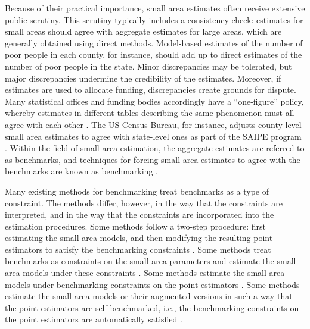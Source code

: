 \documentclass[12pt]{article}
\begin{document}
Because of their practical importance, small area estimates often receive extensive public scrutiny.   This scrutiny typically includes a consistency check: estimates for small areas should agree with aggregate estimates for large areas, which are generally obtained using direct methods.  Model-based estimates of the number of poor people in each county, for instance, should add up to direct estimates of the number of poor people in the state.  Minor discrepancies may be tolerated, but major discrepancies undermine the credibility of the estimates.  Moreover, if estimates are used to allocate funding, discrepancies create grounds for dispute.  Many statistical offices and funding bodies accordingly have a ``one-figure'' policy, whereby estimates in different tables describing the same phenomenon must all agree with each other \citep[][p. 232]{dewaal2016obtaining}.  The US Census Bureau, for instance, adjusts county-level small area estimates to agree with state-level ones as part of the SAIPE program \citep{census2013saipe}.  Within the field of small area estimation, the aggregate estimates are referred to as benchmarks, and techniques for forcing small area estimates to agree with the benchmarks are known as benchmarking \citep{pfeffermann2013new}.

Many existing methods for benchmarking treat benchmarks as a type of constraint. The methods differ, however, in the way that the constraints are interpreted, and in the way that the constraints are incorporated into the estimation procedures.  Some methods follow a two-step procedure: first estimating the small area models, and then modifying the resulting point estimators to satisfy the benchmarking constraints \citep{you2004benchmarking,datta2011bayesian,berg2009spree,berg2012benchmarked,fabrizi2012constrained,steorts2013estimation,fabrizi2014mapping,ghosh2015benchmarked}.
Some methods treat benchmarks as constraints on the small area parameters and estimate the small area models under these constraints  \citep{pfeffermann1991some,pfeffermann2006small,fabrizi2012constrained,pfeffermann2014single}.  Some methods estimate the small area models under benchmarking constraints on the point estimators \citep{wang2008small,bell2013benchmarking}.  Some methods estimate the small area models or their augmented versions in such a way that the point estimators are self-benchmarked, i.e., the benchmarking constraints on the point estimators are automatically satisfied \citep[][Sections 4 and 5]{you2002pseudo,you2003pseudo,wang2008small,you2013performance,bell2013benchmarking}.
\end{document}
